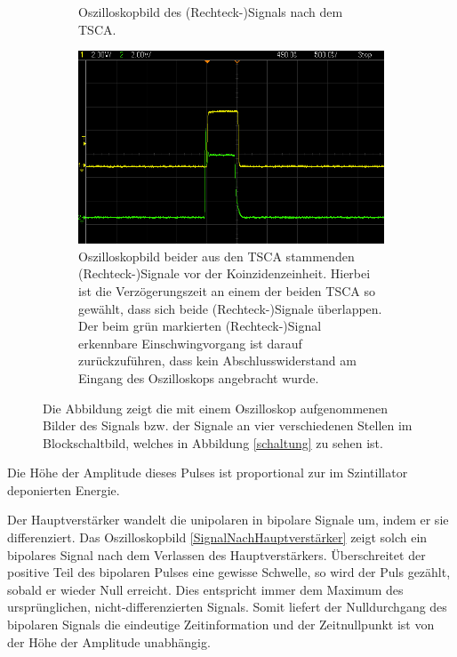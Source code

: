 \begin{figure}[H]
\begin{subfigure}[t]{0.495\textwidth}
		\caption{Oszilloskopbild des (Rechteck-)Signals nach dem TSCA.}
		\label{SignalNachTSCA}
	\end{subfigure}
	\begin{subfigure}[t]{0.495\textwidth}
		\centering
		\includegraphics[width=\textwidth]{img/BeideSignaleVorKoinzidenzeinheit}
		\caption{Oszilloskopbild beider aus den TSCA stammenden (Rechteck-)Signale vor der Koinzidenzeinheit. Hierbei ist die Verzögerungszeit an einem der beiden TSCA so gewählt, dass sich beide (Rechteck-)Signale überlappen. Der beim grün markierten (Rechteck-)Signal erkennbare Einschwingvorgang ist darauf zurückzuführen, dass kein Abschlusswiderstand am Eingang des Oszilloskops angebracht wurde.}
		\label{BeideSignaleVorKoinzidenzeinheit}
	\end{subfigure}
	\caption{Die Abbildung zeigt die mit einem Oszilloskop aufgenommenen Bilder des Signals bzw. der Signale an vier verschiedenen Stellen im Blockschaltbild, welches in Abbildung \ref{schaltung} zu sehen ist.}
	\label{Oszilloskopbilder}
\end{figure}
\noindent Die Höhe der Amplitude dieses Pulses ist proportional zur im Szintillator deponierten Energie.

Der Hauptverstärker wandelt die unipolaren in bipolare Signale um, indem er sie differenziert.
Das Oszilloskopbild \ref{SignalNachHauptverstärker} zeigt solch ein bipolares Signal nach dem Verlassen des Hauptverstärkers.
Überschreitet der positive Teil des bipolaren Pulses eine gewisse Schwelle, so wird der Puls gezählt, sobald er wieder Null erreicht.
Dies entspricht immer dem Maximum des ursprünglichen, nicht-differenzierten Signals.
Somit liefert der Nulldurchgang des bipolaren Signals die eindeutige Zeitinformation und der Zeitnullpunkt ist von der Höhe der Amplitude unabhängig.

